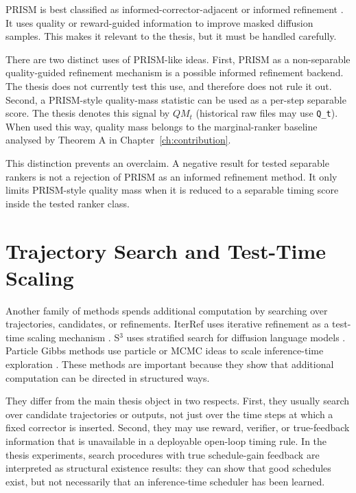 PRISM is best classified as informed-corrector-adjacent or informed refinement
\parencite{kim2025prism}. It uses quality or reward-guided information to
improve masked diffusion samples. This makes it relevant to the thesis, but it
must be handled carefully.

There are two distinct uses of PRISM-like ideas. First, PRISM as a
non-separable quality-guided refinement mechanism is a possible informed
refinement backend. The thesis does not currently test this use, and therefore
does not rule it out. Second, a PRISM-style quality-mass statistic can be used
as a per-step separable score. The thesis denotes this signal by $QM_t$
(historical raw files may use \texttt{Q\_t}). When used this way, quality mass
belongs to the marginal-ranker baseline analysed by Theorem A in
Chapter~\ref{ch:contribution}.

This distinction prevents an overclaim. A negative result for tested separable
rankers is not a rejection of PRISM as an informed refinement method. It only
limits PRISM-style quality mass when it is reduced to a separable timing score
inside the tested ranker class.

\section{Trajectory Search and Test-Time Scaling}
\label{sec:ch4-search}

Another family of methods spends additional computation by searching over
trajectories, candidates, or refinements. IterRef uses iterative refinement as
a test-time scaling mechanism \parencite{lee2025iterref}. S$^3$ uses
stratified search for diffusion language models \parencite{bilal2026s3}.
Particle Gibbs methods use particle or MCMC ideas to scale inference-time
exploration \parencite{dang2025particlegibbs}. These methods are important
because they show that additional computation can be directed in structured
ways.

They differ from the main thesis object in two respects. First, they usually
search over candidate trajectories or outputs, not just over the time steps at
which a fixed corrector is inserted. Second, they may use reward, verifier, or
true-feedback information that is unavailable in a deployable open-loop timing
rule. In the thesis experiments, search procedures with true schedule-gain
feedback are interpreted as structural existence results: they can show that
good schedules exist, but not necessarily that an inference-time scheduler has
been learned.

